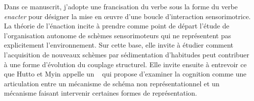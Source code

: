 Dans ce manuscrit, j'adopte une francisation du verbe  sous la forme du verbe \emph{enacter} pour désigner la mise en \oe uvre d'une boucle d'interaction sensorimotrice. 
La théorie de l'énaction incite à prendre comme point de départ l'étude de l'organisation autonome de schèmes sensorimoteurs qui ne représentent pas explicitement l'environnement. Sur cette base, elle invite à étudier comment l'acquisition de nouveaux schèmes par sédimentation d'habitudes peut contribuer à une forme d'évolution du couplage structurel.
Elle invite ensuite à entrevoir ce que Hutto et Myin appelle un \og {} \fg\ \cite{hutto_evolving_2017} qui propose d'examiner la cognition comme une articulation entre un mécanisme de schéma non représentationnel et un mécanisme faisant intervenir certaines formes de représentation.





